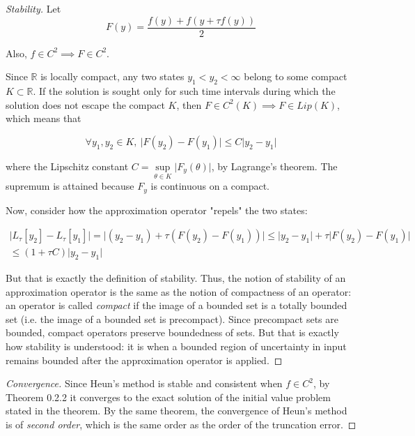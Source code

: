 \documentclass[a4paper]{amsproc}
\theoremstyle{plain}
\theoremstyle{definition}
\theoremstyle{remark}
\numberwithin{equation}{section}
\renewcommand{\le}{\leqslant}\renewcommand{\leq}{\leqslant}
\begin{document}
\begin{proof}[Stability]

Let
  \begin{equation}\label{eq:3.8} 
 F(y) = \frac{f(y)  + f(y + \tau f(y))}{2}
 \end{equation}
 
  Also, $f \in C^2 \implies F \in C^2$.
 
 Since $\mathbb{R}$ is locally compact, any two states $y_1 < y_2 < \infty $ belong to some compact $K \subset \mathbb{R}$. If the solution is sought only for such time intervals during which the solution does not escape the compact $K$, then $F \in C^2(K) \implies F \in Lip(K)$, which means that
 
  \begin{equation}\label{eq:3.9}
 \forall y_1, y_2 \in K, ~ 
 \lvert F(y_2)- F(y_1) \rvert \le C \lvert y_2 - y_1 \rvert
 \end{equation}
 
 where the Lipschitz constant $C = \underset{\theta \in K}{\sup} \lvert F_y(\theta) \rvert $, by Lagrange's theorem. The supremum is attained because $F_y$ is continuous on a compact. 
 
 Now, consider how the approximation operator "repels" the two states:
 
 \begin{multline}\label{eq:3.10}
  \lvert L_{\tau}[y_2] - L_{\tau}[y_1] \rvert = \lvert (y_2 - y_1) + \tau(F(y_2)- F(y_1)) \rvert \le \lvert y_2 - y_1 \rvert + \tau \lvert F(y_2)- F(y_1) \rvert 
  \\ \le (1 + \tau C) \lvert y_2 - y_1 \rvert
 \end{multline}

 But that is exactly the definition of stability. Thus, the notion of stability of an approximation operator is the same as the notion of compactness of an operator: an operator is called \emph{compact} if the image of a bounded set is a totally bounded set (i.e. the image of a bounded set is precompact). Since precompact sets are bounded, compact operators preserve boundedness of sets. But that is exactly how stability is understood: it is when a bounded region of uncertainty in input remains bounded after the approximation operator is applied. 
 
\end{proof}

\begin{proof}[Convergence]
 
 Since Heun's method is stable and consistent when $f \in C^2$, by Theorem 0.2.2 it converges to the exact solution of the initial value problem stated in the theorem. By the same theorem, the convergence of Heun's method is of \emph{second order}, which is the same order as the order of the truncation error.
 
\end{proof}
\end{document}
